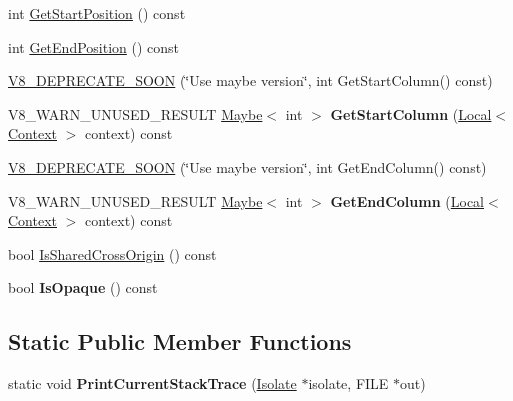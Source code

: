 \begin{DoxyCompactItemize}
\item 
int \hyperlink{classv8_1_1Message_a31a550a1d3d09a2d72d0742be821956f}{Get\+Start\+Position} () const 
\item 
int \hyperlink{classv8_1_1Message_a50cbec87379e628b1647466926882037}{Get\+End\+Position} () const 
\item 
\hyperlink{classv8_1_1Message_a4715c868bd87bbc65a74c8aca27ec692}{V8\+\_\+\+D\+E\+P\+R\+E\+C\+A\+T\+E\+\_\+\+S\+O\+O\+N} (\char`\"{}Use maybe version\char`\"{}, int Get\+Start\+Column() const)
\item 
\hypertarget{classv8_1_1Message_aedffb63ec9761af77b9492351b0bd8a2}{}V8\+\_\+\+W\+A\+R\+N\+\_\+\+U\+N\+U\+S\+E\+D\+\_\+\+R\+E\+S\+U\+L\+T \hyperlink{classv8_1_1Maybe}{Maybe}$<$ int $>$ {\bfseries Get\+Start\+Column} (\hyperlink{classv8_1_1Local}{Local}$<$ \hyperlink{classv8_1_1Context}{Context} $>$ context) const \label{classv8_1_1Message_aedffb63ec9761af77b9492351b0bd8a2}

\item 
\hyperlink{classv8_1_1Message_a9290b52ab2eaebc65fe44b432fc58766}{V8\+\_\+\+D\+E\+P\+R\+E\+C\+A\+T\+E\+\_\+\+S\+O\+O\+N} (\char`\"{}Use maybe version\char`\"{}, int Get\+End\+Column() const)
\item 
\hypertarget{classv8_1_1Message_aa6f918e778dd9ad173dbdfa75c9f614f}{}V8\+\_\+\+W\+A\+R\+N\+\_\+\+U\+N\+U\+S\+E\+D\+\_\+\+R\+E\+S\+U\+L\+T \hyperlink{classv8_1_1Maybe}{Maybe}$<$ int $>$ {\bfseries Get\+End\+Column} (\hyperlink{classv8_1_1Local}{Local}$<$ \hyperlink{classv8_1_1Context}{Context} $>$ context) const \label{classv8_1_1Message_aa6f918e778dd9ad173dbdfa75c9f614f}

\item 
bool \hyperlink{classv8_1_1Message_a03228f50c40c45da52f424bdd64598d1}{Is\+Shared\+Cross\+Origin} () const 
\item 
\hypertarget{classv8_1_1Message_a2ab104d29e13bc942f345e09472ed531}{}bool {\bfseries Is\+Opaque} () const \label{classv8_1_1Message_a2ab104d29e13bc942f345e09472ed531}

\end{DoxyCompactItemize}
\subsection*{Static Public Member Functions}
\begin{DoxyCompactItemize}
\item 
\hypertarget{classv8_1_1Message_ae5d67d123c5611e6bc36824c938cbfa5}{}static void {\bfseries Print\+Current\+Stack\+Trace} (\hyperlink{classv8_1_1Isolate}{Isolate} $\ast$isolate, F\+I\+L\+E $\ast$out)\label{classv8_1_1Message_ae5d67d123c5611e6bc36824c938cbfa5}

\end{DoxyCompactItemize}
